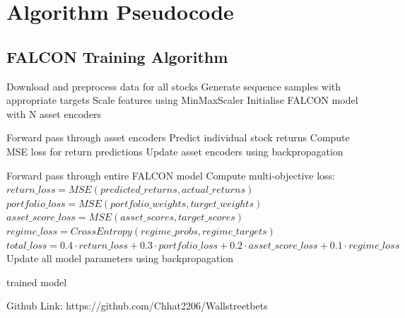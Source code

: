 \documentclass[conference]{IEEEtran}
\begin{document}
\section{Algorithm Pseudocode}

\subsection{FALCON Training Algorithm}
\begin{algorithmic}[1]
\State Download and preprocess data for all stocks
\State Generate sequence samples with appropriate targets
\State Scale features using MinMaxScaler
\State Initialise FALCON model with N asset encoders

        \State Forward pass through asset encoders
        \State Predict individual stock returns
        \State Compute MSE loss for return predictions
        \State Update asset encoders using backpropagation
    \EndFor
\EndFor

        \State Forward pass through entire FALCON model
        \State Compute multi-objective loss:
        \State $return\_loss = MSE(predicted\_returns, actual\_returns)$
        \State $portfolio\_loss = MSE(portfolio\_weights, target\_weights)$
        \State $asset\_score\_loss = MSE(asset\_scores, target\_scores)$
        \State $regime\_loss = CrossEntropy(regime\_probs, regime\_targets)$
        \State $total\_loss = 0.4 \cdot return\_loss + 0.3 \cdot portfolio\_loss + 0.2 \cdot asset\_score\_loss + 0.1 \cdot regime\_loss$
        \State Update all model parameters using backpropagation
    \EndFor
\EndFor

\State \Return trained model
\EndProcedure
\end{algorithmic}


\href{https://github.com/Chhat2206/Wallstreetbets}{\faGitSquare}
Github Link: https://github.com/Chhat2206/Wallstreetbets
\end{document}
